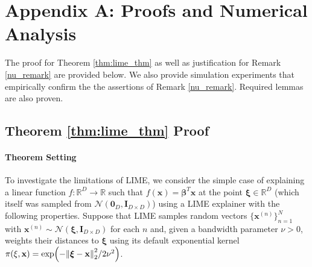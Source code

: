 \documentclass[12pt]{article}  %
\newcommand{\bI}{\mathbf{I}}
\begin{document}
    \section*{Appendix A: Proofs and Numerical Analysis}  
        \label{apx_sec:proofs}    
        The proof for Theorem \ref{thm:lime_thm} as well as justification for Remark \ref{nu_remark} are provided below. We also provide simulation experiments that empirically confirm the the assertions of Remark \ref{nu_remark}. Required lemmas are also proven.
        
         \subsection{Theorem  
        \ref{thm:lime_thm} Proof}
        \paragraph{Theorem Setting}
        
            To investigate the limitations of LIME, we consider the simple case of explaining a linear function $f:\mathbb{R}^D \rightarrow \mathbb{R}$ such that $f(\mathbf{x}) = \boldsymbol{\beta}^T \mathbf{x}$ at the point $\boldsymbol{\xi}\in \mathbb{R}^D$ (which itself was sampled from $\mathcal{N}(\mathbf{0}_D, \bI_{D\times D})$) using a LIME explainer with the following properties. Suppose that LIME samples random vectors $\{\mathbf{x}^{(n)}\}_{n=1}^N$ with $\mathbf{x}^{(n)} \sim \mathcal{N}(\boldsymbol{\xi},\bI_{D\times D})$ for each $n$ and, given a bandwidth parameter $\nu > 0$, weights their distances to $\boldsymbol{\xi}$ using its default exponential kernel $\pi(\xi,\mathbf{x}) = \exp(-\norm{\boldsymbol{\xi} - \mathbf{x}}_2^2/2\nu^2)$. 
            
\end{document}
